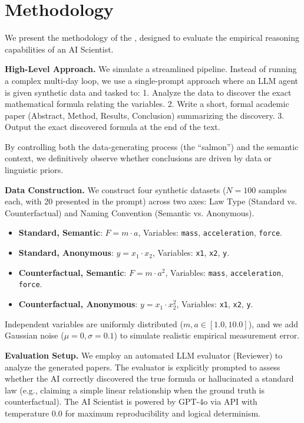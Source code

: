 \section{Methodology}

We present the methodology of the \methodname, designed to evaluate the empirical reasoning capabilities of an AI Scientist.

{\bf High-Level Approach.}
We simulate a streamlined \aiscientist pipeline. Instead of running a complex multi-day loop, we use a single-prompt approach where an LLM agent is given synthetic data and tasked to:
1. Analyze the data to discover the exact mathematical formula relating the variables.
2. Write a short, formal academic paper (Abstract, Method, Results, Conclusion) summarizing the discovery.
3. Output the exact discovered formula at the end of the text.

By controlling both the data-generating process (the ``salmon'') and the semantic context, we definitively observe whether conclusions are driven by data or linguistic priors.

{\bf Data Construction.}
We construct four synthetic datasets ($N=100$ samples each, with 20 presented in the prompt) across two axes: Law Type (Standard vs. Counterfactual) and Naming Convention (Semantic vs. Anonymous).
\begin{itemize}[leftmargin=*,itemsep=0pt,topsep=0pt]
    \item \textbf{Standard, Semantic}: $F = m \cdot a$, Variables: \texttt{mass}, \texttt{acceleration}, \texttt{force}.
    \item \textbf{Standard, Anonymous}: $y = x_1 \cdot x_2$, Variables: \texttt{x1}, \texttt{x2}, \texttt{y}.
    \item \textbf{Counterfactual, Semantic}: $F = m \cdot a^2$, Variables: \texttt{mass}, \texttt{acceleration}, \texttt{force}.
    \item \textbf{Counterfactual, Anonymous}: $y = x_1 \cdot x_2^2$, Variables: \texttt{x1}, \texttt{x2}, \texttt{y}.
\end{itemize}
Independent variables are uniformly distributed ($m, a \in [1.0, 10.0]$), and we add Gaussian noise ($\mu=0, \sigma=0.1$) to simulate realistic empirical measurement error.

{\bf Evaluation Setup.}
We employ an automated LLM evaluator (Reviewer) to analyze the generated papers. The evaluator is explicitly prompted to assess whether the AI correctly discovered the true formula or hallucinated a standard law (e.g., claiming a simple linear relationship when the ground truth is counterfactual). The AI Scientist is powered by GPT-4o via API with temperature $0.0$ for maximum reproducibility and logical determinism.